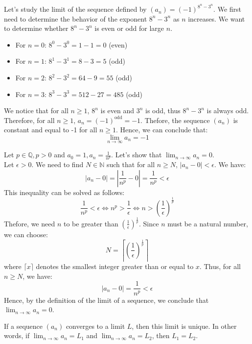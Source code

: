 \begin{eg}
    Let's study the limit of the sequence defined by \( (a_n) = (-1)^{8^n - 3^n} \). We first need to determine the behavior of the exponent \( 8^n - 3^n \) as \( n \) increases. We want to determine whether \( 8^n - 3^n \) is even or odd for large \( n \).
    \begin{itemize}[itemsep=1pt,label=$\circ$]
        \item For \( n = 0 \): \( 8^0 - 3^0 = 1 - 1 = 0 \) (even)
        \item For \( n = 1 \): \( 8^1 - 3^1 = 8 - 3 = 5 \) (odd)
        \item For \( n = 2 \): \( 8^2 - 3^2 = 64 - 9 = 55 \) (odd)
        \item For \( n = 3 \): \( 8^3 - 3^3 = 512 - 27 = 485 \) (odd)
    \end{itemize}
    We notice that for all \( n \geq 1 \), $8^n$ is even and $3^n$ is odd, thus \( 8^n - 3^n \) is always odd. Therefore, for all \( n \geq 1 \), \( a_n = (-1)^{\text{odd}} = -1 \). Thefore, the sequence \( (a_n) \) is constant and equal to -1 for all \( n \geq 1 \). Hence, we can conclude that:
    \[\lim_{n \to \infty} a_n = -1 \]
\end{eg}

\begin{eg}
    Let $p \in \mathbb{Q}, p > 0$ and $a_0 = 1, a_n = \frac{1}{n^p}$. Let's show that \( \lim_{n \to \infty} a_n = 0 \). \\
    Let \( \epsilon > 0 \). We need to find \( N \in \mathbb{N} \) such that for all \( n \geq N \), \( |a_n - 0| < \epsilon \). We have:
    \[|a_n - 0| = \left|\frac{1}{n^p} - 0\right| = \frac{1}{n^p} < \epsilon \]
    This inequality can be solved as follows:
    \[
        \frac{1}{n^p} < \epsilon \iff n^p > \frac{1}{\epsilon} \iff n > \left(\frac{1}{\epsilon}\right)^{\frac{1}{p}}
    \]
    Thefore, we need \( n \) to be greater than \( \left(\frac{1}{\epsilon}\right)^{\frac{1}{p}} \). Since \( n \) must be a natural number, we can choose:
    \[ N = \left\lceil \left(\frac{1}{\epsilon}\right)^{\frac{1}{p}} \right\rceil \]
    where \( \lceil x \rceil \) denotes the smallest integer greater than or equal to \( x \). Thus, for all \( n \geq N \), we have:
    \[ |a_n - 0| = \frac{1}{n^p} < \epsilon \]
    Hence, by the definition of the limit of a sequence, we conclude that \( \lim_{n \to \infty} a_n = 0 \).
\end{eg}

\begin{definition}
    If a sequence \( (a_n) \) converges to a limit \( L \), then this limit is unique. In other words, if \( \lim_{n \to \infty} a_n = L_1 \) and \( \lim_{n \to \infty} a_n = L_2 \), then \( L_1 = L_2 \).
\end{definition}

